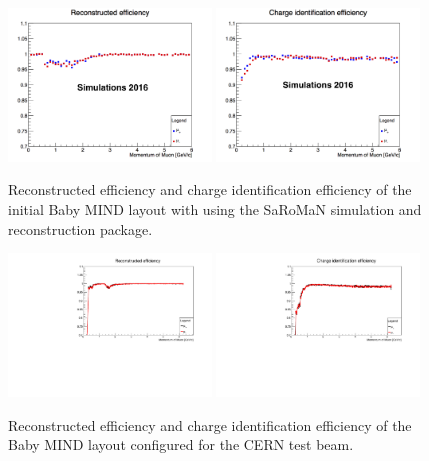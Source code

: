 \begin{figure}[h!]
\centering
\includegraphics[width=0.48\textwidth]{figures/oldStudies/oldRecEff.png}
\includegraphics[width=0.48\textwidth]{figures/oldStudies/oldChargeID.png}
\caption{Reconstructed efficiency and charge identification efficiency of the initial Baby MIND layout with using the SaRoMaN simulation and reconstruction package.}
\label{fig:oldMIND2}
\end{figure}

\begin{figure}[h!]
\centering
\includegraphics[width=0.48\textwidth]{figures/oldStudies/FullFitted.pdf}
\includegraphics[width=0.48\textwidth]{figures/oldStudies/FullChargeID.pdf}
\caption{Reconstructed efficiency and charge identification efficiency of the Baby MIND layout configured for the CERN test beam.}
\label{fig:TestBeamMIND2}
\end{figure}

